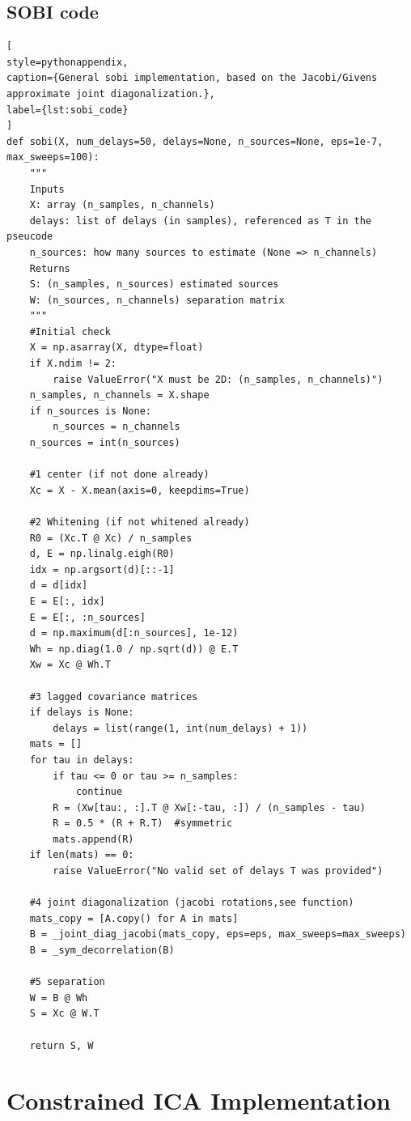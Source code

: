 \subsection{SOBI code}
\label{app:sobi_code}
\begin{lstlisting}[
style=pythonappendix,
caption={General sobi implementation, based on the Jacobi/Givens approximate joint diagonalization.},
label={lst:sobi_code}
]
def sobi(X, num_delays=50, delays=None, n_sources=None, eps=1e-7, max_sweeps=100):
    """
    Inputs
    X: array (n_samples, n_channels)
    delays: list of delays (in samples), referenced as T in the pseucode
    n_sources: how many sources to estimate (None => n_channels)
    Returns
    S: (n_samples, n_sources) estimated sources
    W: (n_sources, n_channels) separation matrix
    """
    #Initial check
    X = np.asarray(X, dtype=float)
    if X.ndim != 2:
        raise ValueError("X must be 2D: (n_samples, n_channels)")
    n_samples, n_channels = X.shape
    if n_sources is None:
        n_sources = n_channels
    n_sources = int(n_sources)

    #1 center (if not done already)
    Xc = X - X.mean(axis=0, keepdims=True)

    #2 Whitening (if not whitened already)
    R0 = (Xc.T @ Xc) / n_samples  
    d, E = np.linalg.eigh(R0)
    idx = np.argsort(d)[::-1]
    d = d[idx]
    E = E[:, idx]
    E = E[:, :n_sources]
    d = np.maximum(d[:n_sources], 1e-12)
    Wh = np.diag(1.0 / np.sqrt(d)) @ E.T          
    Xw = Xc @ Wh.T                                

    #3 lagged covariance matrices
    if delays is None:
        delays = list(range(1, int(num_delays) + 1))
    mats = []
    for tau in delays:
        if tau <= 0 or tau >= n_samples:
            continue
        R = (Xw[tau:, :].T @ Xw[:-tau, :]) / (n_samples - tau) 
        R = 0.5 * (R + R.T)  #symmetric
        mats.append(R)
    if len(mats) == 0:
        raise ValueError("No valid set of delays T was provided")

    #4 joint diagonalization (jacobi rotations,see function)
    mats_copy = [A.copy() for A in mats] 
    B = _joint_diag_jacobi(mats_copy, eps=eps, max_sweeps=max_sweeps) 
    B = _sym_decorrelation(B)

    #5 separation
    W = B @ Wh
    S = Xc @ W.T

    return S, W
\end{lstlisting}

\section{Constrained ICA Implementation}


